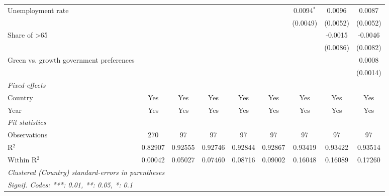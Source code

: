 \begin{table}[htbp]
\begin{tabular}{lcccccccc}
      Unemployment rate                           &          &          &              &              &          & 0.0094$^{*}$          & 0.0096   & 0.0087\\   
                                                  &          &          &              &              &          & (0.0049)              & (0.0052) & (0.0052)\\   
      Share of >65                                &          &          &              &              &          &                       & -0.0015  & -0.0046\\   
                                                  &          &          &              &              &          &                       & (0.0086) & (0.0082)\\   
      Green vs. growth government preferences     &          &          &              &              &          &                       &          & 0.0008\\   
                                                  &          &          &              &              &          &                       &          & (0.0014)\\   
      \midrule
      \emph{Fixed-effects}\\
      Country                                     & Yes      & Yes      & Yes          & Yes          & Yes      & Yes                   & Yes      & Yes\\  
      Year                                        & Yes      & Yes      & Yes          & Yes          & Yes      & Yes                   & Yes      & Yes\\  
      \midrule
      \emph{Fit statistics}\\
      Observations                                & 270      & 97       & 97           & 97           & 97       & 97                    & 97       & 97\\  
      R$^2$                                       & 0.82907  & 0.92555  & 0.92746      & 0.92844      & 0.92867  & 0.93419               & 0.93422  & 0.93514\\  
      Within R$^2$                                & 0.00042  & 0.05027  & 0.07460      & 0.08716      & 0.09002  & 0.16048               & 0.16089  & 0.17260\\  
      \midrule \midrule
      \multicolumn{9}{l}{\emph{Clustered (Country) standard-errors in parentheses}}\\
      \multicolumn{9}{l}{\emph{Signif. Codes: ***: 0.01, **: 0.05, *: 0.1}}\\
   \end{tabular}
\end{table}


